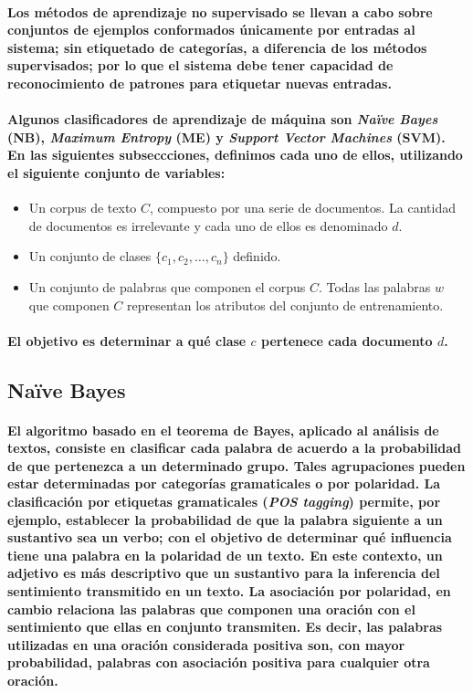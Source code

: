\paragraph{Los m\'etodos de aprendizaje no supervisado se llevan a cabo sobre conjuntos de ejemplos conformados \'unicamente por entradas al sistema; sin etiquetado de categor\'ias, a diferencia de los m\'etodos supervisados; por lo que el sistema debe tener capacidad de reconocimiento de patrones para etiquetar nuevas entradas. }
\paragraph{Algunos clasificadores de aprendizaje de m\'aquina son \textit{Na\"ive Bayes} (NB), \textit{Maximum Entropy} (ME) y \textit{Support Vector Machines} (SVM). En las siguientes subseccciones, definimos cada uno de ellos, utilizando el siguiente conjunto de variables:}

\begin{itemize}
\item Un corpus de texto $C$, compuesto por una serie de documentos. La cantidad de documentos es irrelevante y cada uno de ellos es denominado $d$. 
\item Un conjunto de clases $\{c_{1},c_{2},\ldots,c_{n}\}$ definido.
\item Un conjunto de palabras que componen el corpus $C$. Todas las palabras $w$ que componen $C$ representan los atributos del conjunto de entrenamiento.
\end{itemize}
\paragraph{El objetivo es determinar a qu\'e clase $c$ pertenece cada documento $d$.}

\subsection{Na\"ive Bayes}
\paragraph{El algoritmo basado en el teorema de Bayes, aplicado al an\'alisis de textos, consiste en clasificar cada palabra de acuerdo a la probabilidad de que pertenezca a un determinado grupo. Tales agrupaciones pueden estar determinadas por categor\'ias gramaticales o por polaridad. 
La clasificaci\'on por etiquetas gramaticales (\textit{POS tagging}) permite, por ejemplo, establecer la probabilidad de que la palabra siguiente a un sustantivo sea un verbo; con el objetivo de determinar qu\'e influencia tiene una palabra en la polaridad de un texto. En este contexto, un adjetivo es m\'as descriptivo que un sustantivo para la inferencia del sentimiento transmitido en un texto.
La asociaci\'on por polaridad, en cambio relaciona las palabras que componen una oraci\'on con el sentimiento que ellas en conjunto transmiten. Es decir, las palabras utilizadas en una oraci\'on considerada positiva son, con mayor probabilidad, palabras con asociaci\'on positiva para cualquier otra oraci\'on.}
